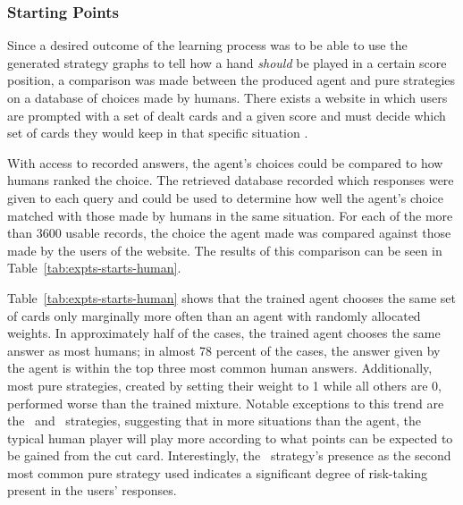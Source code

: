 

\subsubsection{Starting Points}
\label{sec:findings-expts-starts}


Since a desired outcome of the learning process was to be able to use the
generated strategy graphs to tell how a hand \textit{should} be played in a
certain score position,
a comparison was made between the produced agent and pure strategies
on a database of choices made by humans.
%
There exists a website in which users are prompted with a set of dealt cards and
a given score and must decide which set of cards they would keep in that
specific situation
\cite{dailycribbagehand}.

With access to recorded answers,
the agent's choices could be compared to how humans ranked the choice.
%
The retrieved database recorded which responses were given to each query
and could be used to determine how well the agent's choice matched with those
made by humans in the same situation.
%
For each of the more than 3600 usable records,
the choice the agent made was compared against those made by the users of the
website.
%
The results of this comparison can be seen in
Table~\ref{tab:expts-starts-human}. %

Table~\ref{tab:expts-starts-human} shows that the trained agent chooses the same
set of cards only marginally more often than an agent with randomly allocated
weights.
%
In approximately half of the cases,
the trained agent chooses the same answer as most humans;
in almost 78 percent of the cases,
the answer given by the agent is within the top three most common human answers.
%
Additionally,
most pure strategies,
created by setting their weight to 1 while all others are 0,
performed worse than the trained mixture.
%
Notable exceptions to this trend are the \handmaxposs\ and \handmaxavg\ 
strategies,
suggesting that in more situations than the agent,
the typical human player will play more according to what points can be expected
to be gained from the cut card.
%
Interestingly,
the \handmaxposs\ strategy's presence as the second most common pure strategy
used indicates a significant degree of risk-taking present in the users'
responses.

